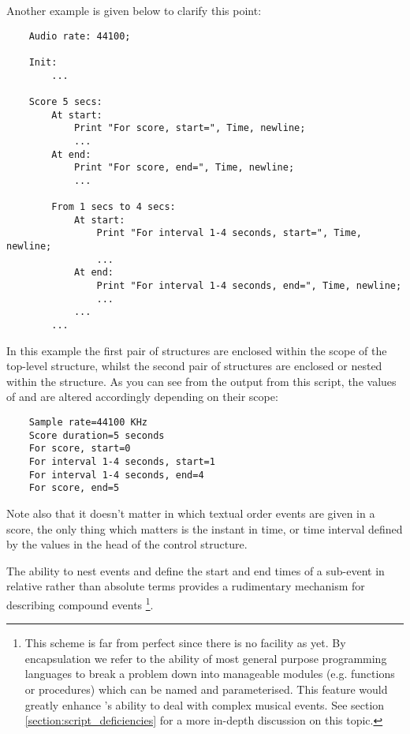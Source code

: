 Another example is given below to clarify this point:

\begin{verbatim}
    Audio rate: 44100;
    
    Init:
        ...
    
    Score 5 secs:
        At start:
            Print "For score, start=", Time, newline;
            ...
        At end:
            Print "For score, end=", Time, newline;
            ...

        From 1 secs to 4 secs:
            At start:
                Print "For interval 1-4 seconds, start=", Time, newline;
                ...
            At end:
                Print "For interval 1-4 seconds, end=", Time, newline;
                ...
            ...
        ...
\end{verbatim}

In this example the first pair of  structures are enclosed within the scope
of the top-level  structure, whilst the second pair of 
structures are enclosed or nested within the  structure. As you can
see from the output from this script, the values of  and 
are altered accordingly depending on their scope:

\begin{verbatim}
    Sample rate=44100 KHz
    Score duration=5 seconds
    For score, start=0
    For interval 1-4 seconds, start=1
    For interval 1-4 seconds, end=4
    For score, end=5
\end{verbatim}

Note also that it doesn't matter in which textual order events are given in
a score, the only thing which matters is the instant in time, or time interval
defined by the values in the head of the control structure.

The ability to nest events and define the start and end times of a
sub-event in relative rather than absolute terms provides a rudimentary
mechanism for describing compound events \footnote{This scheme is far from
perfect since there is no  facility as yet.
By encapsulation we refer to the ability of most general purpose
programming languages to break a problem down into manageable modules
(e.g. functions or procedures) which can be named and parameterised.
This feature would greatly enhance \tao's ability to deal with complex
musical events. See section \ref{section:script_deficiencies} for a more
in-depth discussion on this topic.}.   

